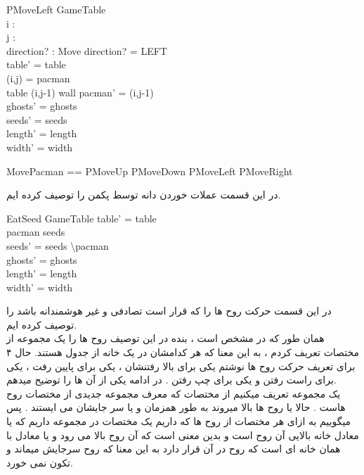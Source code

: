 \documentclass{article}
\begin{document}
\begin{schema}{PMoveLeft}
\Delta GameTable\\
i : \nat\\
j : \nat\\
direction? : Move
\where
direction? = LEFT\\
table' = table\\
(i,j) = pacman\\
table (i,j-1) \neq wall
pacman' = (i,j-1)\\
ghosts' = ghosts\\
seeds' = seeds\\
length' = length\\
width' = width 
\end{schema}

\begin{zed}
MovePacman == PMoveUp \lor PMoveDown \lor PMoveLeft \lor PMoveRight 
\end{zed}

در این قسمت عملات خوردن دانه توسط پکمن را توصیف کرده ایم.

\begin{schema}{EatSeed}
\Delta GameTable
\where
table' = table\\
pacman \in seeds\\
seeds' = seeds \backslash pacman\\
ghosts' = ghosts\\
length' = length\\
width' = width 
\end{schema}


در این قسمت حرکت روح ها را که قرار است تصادفی و غیر هوشمندانه باشد را توصیف کرده ایم.
\\
همان طور که در  مشخص است ، بنده در این توصیف روح ها را یک مجموعه از مختصات تعریف کردم ، به این معنا که هر کدامشان در یک خانه از جدول هستند. حال ۴  برای تعریف حرکت روح ها نوشتم یکی برای بالا رفتنشان ،  یکی برای پایین رفت ،  یکی برای راست رفتن و یکی برای چپ رفتن . در ادامه یکی از آن ها را توضیح میدهم.
\\
یک مجموعه  تعریف میکنیم از مختصات که معرف مجموعه جدیدی از مختصات روح هاست . حالا یا روح ها بالا میروند به طور همزمان و یا سر جایشان می ایستند . پس میگوییم به ازای هر مختصات از روح ها که داریم یک مختصات در مجموعه  داریم که یا معادل خانه بالایی آن روح است و بدین معنی است که آن روح بالا می رود و یا معادل با همان خانه ای است که روح در آن قرار دارد به این معنا که روح سرجایش میماند و تکون نمی خورد.
\end{document}

